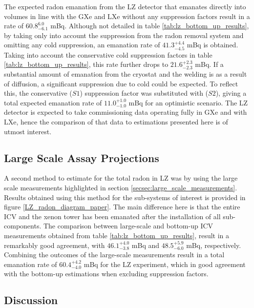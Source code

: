 The expected radon emanation from the LZ detector that emanates directly into volumes in line with the GXe and LXe without any suppression factors result in a rate of $60.8^{6.0}_{-6.1}$ mBq. Although not detailed in table \ref{tab:lz_bottom_up_results}, by taking only into account the suppression from the radon removal system and omitting any cold suppression, an emanation rate of $41.3^{+4.4}_{-4.5}$ mBq is obtained. Taking into account the conservative cold suppression factors in table \ref{tab:lz_bottom_up_results}, this rate further drops to $21.6^{+2.3}_{-2.3}$ mBq. If a substantial amount of emanation from the cryostat and the welding is as a result of diffusion, a significant suppression due to cold could be expected. To reflect this, the conservative ($S1$) suppression factor was substituted with ($S2$), giving a total expected emanation rate of $11.0^{+1.0}_{-1.0}$ mBq for an optimistic scenario. The LZ detector is expected to take commissioning data operating fully in GXe and with LXe, hence the comparison of that data to estimations presented here is of utmost interest.

\subsection{Large Scale Assay Projections}

A second method to estimate for the total radon in LZ was by using the large scale measurements highlighted in section \ref{secsec:large_scale_measurements}. Results obtained using this method for the sub-systems of interest is provided in figure \ref{LZ_radon_diagram_paper}. The main difference here is that the entire ICV and the xenon tower has been emanated after the installation of all sub-components. The comparison between large-scale and bottom-up ICV measurements obtained from table \ref{tab:lz_bottom_up_results}, result in a remarkably good agreement, with $46.1^{+4.0}_{-3.8}$ mBq and $48.5^{+5.9}_{-6.0}$ mBq, respectively. Combining the outcomes of the large-scale measurements result in a total emanation rate of $60.4^{+4.2}_{-4.0}$ mBq for the LZ experiment, which in good agreement with the bottom-up estimations when excluding suppression factors.


\subsection{Discussion}

